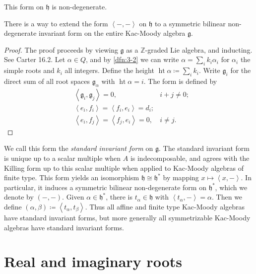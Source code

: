 \documentclass[11pt, letterpaper]{article}
\theoremstyle{plain}
\begin{document}
\begin{proposition}\label{prp:4-8}
	This form on $\mathfrak{h} $ is non-degenerate.
\end{proposition}

\begin{theorem}\label{thm:4-9}
	There is a way to extend the form $\left\langle -,- \right\rangle $ on $\mathfrak{h} $ to a symmetric bilinear non-degenerate invariant form on the entire Kac-Moody algebra $\mathfrak{g} $.
\end{theorem}
\begin{proof}
	The proof proceeds by viewing $\mathfrak{g} $ as a $\mathbb{Z} $-graded Lie algebra, and inducting. See Carter 16.2. Let $\alpha \in Q$, and by \cref{dfn:3-2} we can write $\alpha =\sum_{i} k_i \alpha _i$ for $\alpha _i$ the simple roots and $k_i$ all integers. Define the height $\operatorname{ht} \alpha \coloneqq \sum_{i} k_i$. Write $\mathfrak{g} _i$ for the direct sum of all root spaces $\mathfrak{g} _{\alpha } $ with $\operatorname{ht} \alpha =i$. The form is defined by
	\begin{align*}
		&\left\langle \mathfrak{g} _i,\mathfrak{g} _j \right\rangle =0,& i+j\neq 0;\\
		&\left\langle e_i,f_i \right\rangle =\left\langle f_i,e_i \right\rangle =d_i;\\
		&\left\langle e_i,f_j \right\rangle =\left\langle f_j,e_i \right\rangle =0,& i\neq j
	.\end{align*}
\end{proof}


We call this form the \emph{standard invariant form} on $\mathfrak{g} $. The standard invariant form is unique up to a scalar multiple when $A$ is indecomposable, and agrees with the Killing form up to this scalar multiple when applied to Kac-Moody algebras of finite type. This form yields an isomorphism $\mathfrak{h} \cong \mathfrak{h} ^*$ by mapping $x\mapsto \left\langle x,- \right\rangle $. In particular, it induces a symmetric bilinear non-degenerate form on $\mathfrak{h} ^*$, which we denote by $(-,-)$. Given $\alpha \in \mathfrak{h} ^*$, there is $t_\alpha \in \mathfrak{h} $ with $\left\langle t_\alpha ,- \right\rangle =\alpha $. Then we define $(\alpha ,\beta )\coloneqq \left\langle t_\alpha ,t_\beta  \right\rangle $. Thus all affine and finite type Kac-Moody algebras have standard invariant forms, but more generally all symmetrizable Kac-Moody algebras have standard invariant forms.



\section{Real and imaginary roots}
\end{document}
